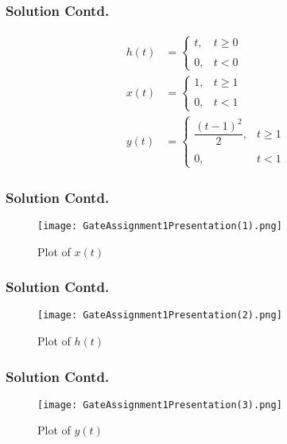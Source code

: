 \documentclass{beamer}
\begin{document}
\begin{frame}
\frametitle{Solution Contd.}
\begin{align}
    h(t)&=\begin{cases}
	t, & t \geq 0 \\~\\[-1em]
	0, & t <0
	\end{cases}\\
	x(t)&=\begin{cases}
	1, & t \geq 1 \\~\\[-1em]
	0, & t <1
	\end{cases}\\
	y(t)&=\begin{cases}
	\dfrac{(t-1)^2}{2}, & t \geq 1 \\~\\[-1em]
	0, & t <1
	\end{cases}
\end{align}
\end{frame}

\begin{frame}
\frametitle{Solution Contd.}
\begin{figure}[!h]
 \centering
 \texttt{[image: GateAssignment1Presentation(1).png]}
 \caption{Plot of $x(t)$}
 \label{plot}
\end{figure}
\end{frame}


\begin{frame}
\frametitle{Solution Contd.}
\begin{figure}[!h]
 \centering
 \texttt{[image: GateAssignment1Presentation(2).png]}
 \caption{Plot of $h(t)$}
 \label{plot}
\end{figure}
\end{frame}

\begin{frame}
\frametitle{Solution Contd.}
\begin{figure}[!h]
 \centering
 \texttt{[image: GateAssignment1Presentation(3).png]}
 \caption{Plot of $y(t)$}
 \label{plot}
\end{figure}
\end{frame}
\end{document}

